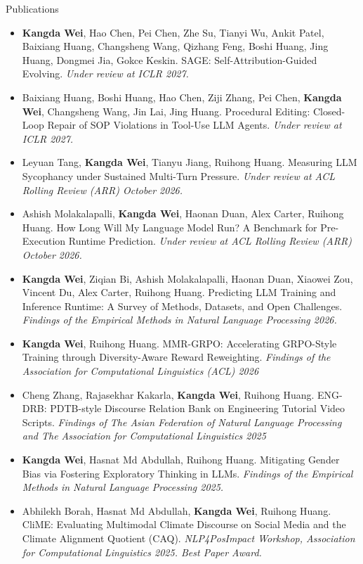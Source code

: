 \documentclass[a4paper, 12pt]{resume} %
\begin{document}
\begin{rSection}{Publications}
\begin{itemize}[noitemsep, topsep=0pt, leftmargin=*]
\item {\bf Kangda Wei}, Hao Chen, Pei Chen, Zhe Su, Tianyi Wu, Ankit Patel, Baixiang Huang, Changsheng Wang, Qizhang Feng, Boshi Huang, Jing Huang, Dongmei Jia, Gokce Keskin. SAGE: Self-Attribution-Guided Evolving. {\em Under review at ICLR 2027.}
\item Baixiang Huang, Boshi Huang, Hao Chen, Ziji Zhang, Pei Chen, {\bf Kangda Wei}, Changsheng Wang, Jin Lai, Jing Huang. Procedural Editing: Closed-Loop Repair of SOP Violations in Tool-Use LLM Agents. {\em Under review at ICLR 2027.}
\item Leyuan Tang, {\bf Kangda Wei}, Tianyu Jiang, Ruihong Huang. Measuring LLM Sycophancy under Sustained Multi-Turn Pressure. {\em Under review at ACL Rolling Review (ARR) October 2026.}
\item Ashish Molakalapalli, {\bf Kangda Wei}, Haonan Duan, Alex Carter, Ruihong Huang. How Long Will My Language Model Run? A Benchmark for Pre-Execution Runtime Prediction. {\em Under review at ACL Rolling Review (ARR) October 2026.}
\item {\bf Kangda Wei}, Ziqian Bi, Ashish Molakalapalli, Haonan Duan, Xiaowei Zou, Vincent Du, Alex Carter, Ruihong Huang. Predicting LLM Training and Inference Runtime: A Survey of Methods, Datasets, and Open Challenges. {\em Findings of the Empirical Methods in Natural Language Processing 2026.}
\item {\bf Kangda Wei}, Ruihong Huang. MMR-GRPO: Accelerating GRPO-Style Training through Diversity-Aware Reward Reweighting. {\em Findings of the Association for Computational Linguistics (ACL) 2026}
\item Cheng Zhang, Rajasekhar Kakarla, {\bf Kangda Wei}, Ruihong Huang. ENG-DRB: PDTB-style Discourse Relation Bank on Engineering Tutorial Video Scripts. {\em Findings of The Asian Federation of Natural Language Processing and The Association for Computational Linguistics 2025}
\item {\bf Kangda Wei}, Hasnat Md Abdullah, Ruihong Huang. Mitigating Gender Bias via Fostering Exploratory Thinking in LLMs. {\em Findings of the Empirical Methods in Natural Language Processing 2025.}
\item Abhilekh Borah, Hasnat Md Abdullah, {\bf Kangda Wei}, Ruihong Huang. CliME: Evaluating Multimodal Climate Discourse on Social Media and the Climate Alignment Quotient (CAQ). {\em NLP4PosImpact Workshop, Association for Computational Linguistics 2025. Best Paper Award.}

\end{itemize}
\end{rSection}
\end{document}
